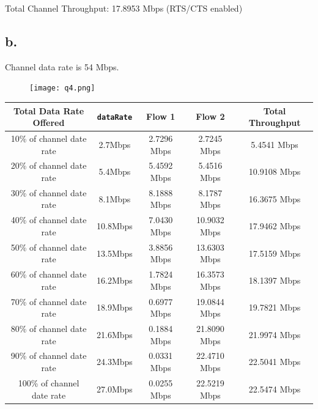 \documentclass[11pt, fleqn]{article}
\begin{document}
Total Channel Throughput: 17.8953 Mbps (RTS/CTS enabled) \\

\subsection*{b.}

Channel data rate is 54 Mbps.

\begin{figure}[H]
    \centering
    \texttt{[image: q4.png]}
\end{figure}

\begin{table}[H]
    \centering
    \begin{tabular}{||c|c||c|c||c||}
         \hline
         Total Data Rate Offered & \texttt{dataRate} & Flow 1 & Flow 2 & Total Throughput \\
         \hline %
         10\% of channel date rate & 2.7Mbps & 2.7296 Mbps & 2.7245 Mbps & 5.4541 Mbps \\
         \hline %
         20\% of channel date rate & 5.4Mbps & 5.4592 Mbps & 5.4516 Mbps & 10.9108 Mbps \\
         \hline %
         30\% of channel date rate & 8.1Mbps & 8.1888 Mbps & 8.1787 Mbps & 16.3675 Mbps \\
         \hline %
         40\% of channel date rate & 10.8Mbps & 7.0430 Mbps & 10.9032 Mbps & 17.9462 Mbps \\
         \hline %
         50\% of channel date rate & 13.5Mbps & 3.8856 Mbps & 13.6303 Mbps & 17.5159 Mbps \\
         \hline %
         60\% of channel date rate & 16.2Mbps & 1.7824 Mbps & 16.3573 Mbps & 18.1397 Mbps \\
         \hline %
         70\% of channel date rate & 18.9Mbps & 0.6977 Mbps & 19.0844 Mbps & 19.7821 Mbps \\
         \hline %
         80\% of channel date rate & 21.6Mbps & 0.1884 Mbps & 21.8090 Mbps & 21.9974 Mbps \\
         \hline %
         90\% of channel date rate & 24.3Mbps & 0.0331 Mbps & 22.4710 Mbps & 22.5041 Mbps \\
         \hline %
         100\% of channel date rate & 27.0Mbps & 0.0255 Mbps & 22.5219 Mbps & 22.5474 Mbps \\
         \hline         
    \end{tabular}
\end{table}
\end{document}

